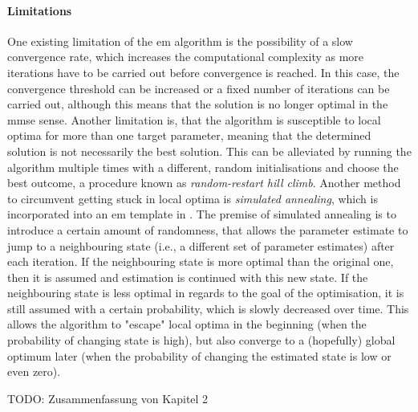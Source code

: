 \paragraph{Limitations}
One existing limitation of the \gls{em} algorithm is the possibility of a slow convergence rate, which increases the computational complexity as more iterations have to be carried out before convergence is reached. In this case, the convergence threshold can be increased or a fixed number of iterations can be carried out, although this means that the solution is no longer optimal in the \gls{mmse} sense. Another limitation is, that the algorithm is susceptible to local optima for more than one target parameter, meaning that the determined solution is not necessarily the best solution. This can be alleviated by running the algorithm multiple times with a different, random initialisations and choose the best outcome, a procedure known as \textit{random-restart hill climb}. Another method to circumvent getting stuck in local optima is \textit{simulated annealing}, which is incorporated into an \gls{em} template in \cite{Guo2007}. The premise of simulated annealing is to introduce a certain amount of randomness, that allows the parameter estimate to jump to a neighbouring state (i.e., a different set of parameter estimates) after each iteration. If the neighbouring state is more optimal than the original one, then it is assumed and estimation is continued with this new state. If the neighbouring state is less optimal in regards to the goal of the optimisation, it is still assumed with a certain probability, which is slowly decreased over time. This allows the algorithm to "escape" local optima in the beginning (when the probability of changing state is high), but also converge to a (hopefully) global optimum later (when the probability of changing the estimated state is low or even zero).


TODO: Zusammenfassung von Kapitel 2


